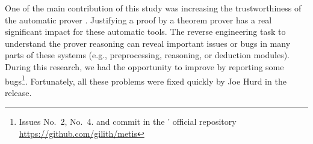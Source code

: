 \documentclass[../main.tex]{subfiles}
\begin{document}
One of the main contribution of this study was
increasing the trustworthiness of the automatic prover \Metis.
Justifying a proof by a theorem prover
has a real significant impact for these automatic tools.
The reverse engineering task to understand the prover reasoning
can reveal important issues or bugs
in many parts of these systems (e.g., preprocessing, reasoning, or
deduction modules). During this research, we had the opportunity
to improve \Metis by reporting some bugs\footnote{Issues No.~2,
No.~4. and commit  in the \Metis' official repository
\url{https://github.com/gilith/metis}}.
Fortunately, all these problems were fixed quickly by Joe Hurd in
the  release.
\end{document}
